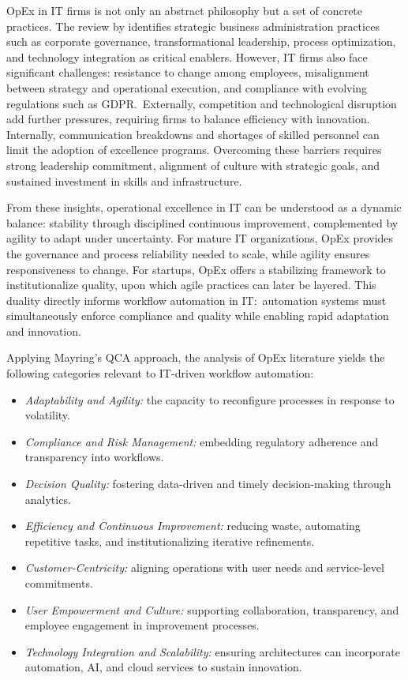 OpEx in IT firms is not only an abstract philosophy but a set of concrete practices. The review by \textcite{owoadeSystematic2024} identifies strategic business administration practices such as corporate governance, transformational leadership, process optimization, and technology integration as critical enablers. However, IT firms also face significant challenges: resistance to change among employees, misalignment between strategy and operational execution, and compliance with evolving regulations such as GDPR.~Externally, competition and technological disruption add further pressures, requiring firms to balance efficiency with innovation. Internally, communication breakdowns and shortages of skilled personnel can limit the adoption of excellence programs. Overcoming these barriers requires strong leadership commitment, alignment of culture with strategic goals, and sustained investment in skills and infrastructure.

From these insights, operational excellence in IT can be understood as a dynamic balance: stability through disciplined continuous improvement, complemented by agility to adapt under uncertainty. For mature IT organizations, OpEx provides the governance and process reliability needed to scale, while agility ensures responsiveness to change. For startups, OpEx offers a stabilizing framework to institutionalize quality, upon which agile practices can later be layered. This duality directly informs workflow automation in IT:~automation systems must simultaneously enforce compliance and quality while enabling rapid adaptation and innovation.

Applying Mayring's QCA approach, the analysis of OpEx literature yields the following categories relevant to IT-driven workflow automation:
\begin{itemize}
    \item \emph{Adaptability and Agility:} the capacity to reconfigure processes in response to volatility.
    \item \emph{Compliance and Risk Management:} embedding regulatory adherence and transparency into workflows.
    \item \emph{Decision Quality:} fostering data-driven and timely decision-making through analytics.
    \item \emph{Efficiency and Continuous Improvement:} reducing waste, automating repetitive tasks, and institutionalizing iterative refinements.
    \item \emph{Customer-Centricity:} aligning operations with user needs and service-level commitments.
    \item \emph{User Empowerment and Culture:} supporting collaboration, transparency, and employee engagement in improvement processes.
    \item \emph{Technology Integration and Scalability:} ensuring architectures can incorporate automation, AI, and cloud services to sustain innovation.
\end{itemize}

